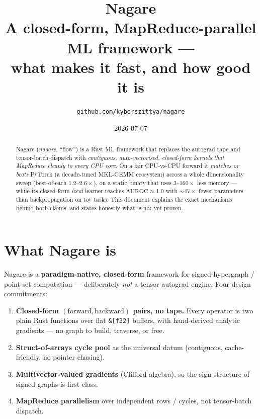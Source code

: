 \documentclass[11pt]{article}
\title{\textbf{Nagare}\\[2pt]\large A closed-form, MapReduce-parallel ML framework ---\\
what makes it fast, and how good it is}
\author{\texttt{github.com/kyberszittya/nagare}}
\date{2026-07-07}
\begin{document}
\maketitle

\begin{abstract}
\noindent Nagare (\emph{nagare}, ``flow'') is a Rust ML
framework that replaces the autograd tape and tensor-batch dispatch with
\emph{contiguous, auto-vectorised, closed-form kernels that MapReduce cleanly to
every CPU core}. On a fair CPU-vs-CPU forward it \emph{matches or beats} PyTorch
(a decade-tuned MKL-GEMM ecosystem) across a whole dimensionality sweep
(best-of-each $1.2$--$2.6\times$), on a static binary that uses $3$--$160\times$
less memory --- while its closed-form \emph{local} learner reaches
$\mathrm{AUROC}\approx1.0$ with $\sim47\times$ fewer parameters than
backpropagation on toy tasks. This document explains the exact mechanisms behind
both claims, and states honestly what is not yet proven.
\end{abstract}

\section{What Nagare is}
Nagare is a \textbf{paradigm-native, closed-form} framework for
signed-hypergraph / point-set computation --- deliberately \emph{not} a tensor
autograd engine. Four design commitments:
\begin{enumerate}\itemsep1pt
  \item \textbf{Closed-form \((\text{forward},\text{backward})\) pairs, no tape.}
  Every operator is two plain Rust functions over flat \texttt{\&[f32]} buffers,
  with hand-derived analytic gradients --- no graph to build, traverse, or free.
  \item \textbf{Struct-of-arrays cycle pool} as the universal datum (contiguous,
  cache-friendly, no pointer chasing).
  \item \textbf{Multivector-valued gradients} (Clifford algebra), so the sign
  structure of signed graphs is first class.
  \item \textbf{MapReduce parallelism} over independent rows / cycles, not
  tensor-batch dispatch.
\end{enumerate}
\end{document}
